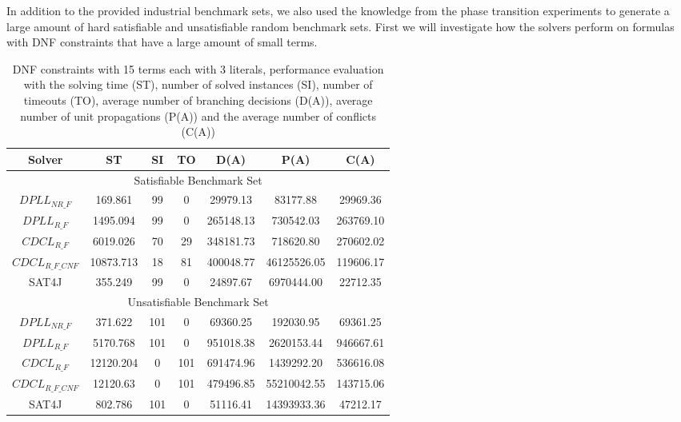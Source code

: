 \documentclass{easychair}
\begin{document}
In addition to the provided industrial benchmark sets, we also used the knowledge from the phase transition experiments to generate a large amount of hard satisfiable and unsatisfiable random benchmark sets. First we will investigate how the solvers perform on formulas with DNF constraints that have a large amount of small terms.

\begin{table}
\centering
\caption{DNF constraints with 15 terms each with 3 literals, performance evaluation with the solving time (ST), number of solved instances (SI), number of timeouts (TO), average number of branching decisions (D(A)), average number of unit propagations (P(A)) and the average number of conflicts (C(A))}
\label{tab:dnf153Sat}
\begin{tabular}{|c|c|c|c|c|c|c|}
\hline
Solver & ST & SI & TO & D(A) & P(A) & C(A)\\ 
\hline
\multicolumn{7}{|c|}{Satisfiable Benchmark Set}\\
\hline
$DPLL_{NR\_F}$ & 169.861 & 99 & 0 & 29979.13 & 83177.88 & 29969.36 \\ 
\hline
$DPLL_{R\_F}$ & 1495.094 & 99 & 0 & 265148.13 & 730542.03 & 263769.10 \\ 
\hline
$CDCL_{R\_F}$ & 6019.026 & 70 & 29 & 348181.73 & 718620.80 & 270602.02 \\ 
\hline
$CDCL_{R\_F\_CNF}$ & 10873.713 & 18 & 81 & 400048.77 & 46125526.05 & 119606.17 \\ 
\hline
SAT4J & 355.249 & 99 & 0 & 24897.67 & 6970444.00 & 22712.35 \\ 
\hline
\multicolumn{7}{|c|}{Unsatisfiable Benchmark Set}\\
\hline
$DPLL_{NR\_F}$ & 371.622 & 101 & 0 & 69360.25 & 192030.95 & 69361.25 \\ 
\hline
$DPLL_{R\_F}$ & 5170.768 & 101 & 0 & 951018.38 & 2620153.44 & 946667.61 \\ 
\hline
$CDCL_{R\_F}$ & 12120.204 & 0 & 101 & 691474.96 & 1439292.20 & 536616.08 \\ 
\hline
$CDCL_{R\_F\_CNF}$ & 12120.63 & 0 & 101 & 479496.85 & 55210042.55 & 143715.06 \\ 
\hline
SAT4J & 802.786 & 101 & 0 & 51116.41 & 14393933.36 & 47212.17 \\ 
\hline
\end{tabular}
\end{table}
\end{document}
